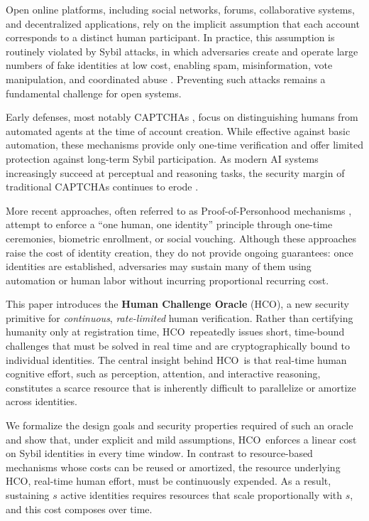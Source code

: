 \documentclass[11pt]{article}
\newcommand{\HCO}{HCO\xspace}
\begin{document}
Open online platforms, including social networks, forums, collaborative systems, and decentralized
applications, rely on the implicit assumption that each account corresponds to a distinct human
 participant. In practice, this assumption is routinely violated by Sybil attacks, in which adversaries create and operate large numbers of fake identities at low cost, enabling spam, misinformation, vote manipulation, and coordinated abuse \cite{douceur2002sybil}. Preventing such attacks remains a fundamental challenge for open systems.

Early defenses, most notably CAPTCHAs \cite{vonahn2003captcha}, focus on distinguishing humans from automated agents at the time of account creation. While effective against basic automation, these mechanisms provide only one-time verification and offer limited protection against long-term Sybil participation. As modern AI systems increasingly succeed at perceptual and reasoning tasks, the security margin of traditional CAPTCHAs continues to erode \cite{geirhos2018generalisation,brendel2019approximating}.

More recent approaches, often referred to as Proof-of-Personhood mechanisms \cite{bowe2020proof,west2020proof}, attempt to enforce a ``one human, one identity'' principle through one-time ceremonies, biometric enrollment, or social vouching. Although these approaches raise the cost of identity creation, they do not provide ongoing guarantees: once identities are established, adversaries may sustain many of them using automation or human labor without incurring proportional recurring cost.

This paper introduces the \textbf{Human Challenge Oracle} (\HCO), a new security primitive for \emph{continuous}, \emph{rate-limited} human verification. Rather than certifying humanity only at registration time, \HCO\ repeatedly issues short, time-bound challenges that must be solved in real time and are cryptographically bound to individual identities. The central insight behind \HCO\ is that real-time human cognitive effort, such as perception,
attention, and interactive reasoning, constitutes a scarce resource that is inherently difficult
to parallelize or amortize across identities.

We formalize the design goals and security properties required of such an oracle and show that, under explicit and mild assumptions, \HCO\ enforces a linear cost on Sybil identities in every time window. In contrast to resource-based mechanisms whose costs can be reused or amortized, the resource underlying \HCO, real-time human effort, must be continuously expended. As a result, sustaining $s$ active identities requires resources that scale proportionally with $s$, and this cost composes over time.
\end{document}

